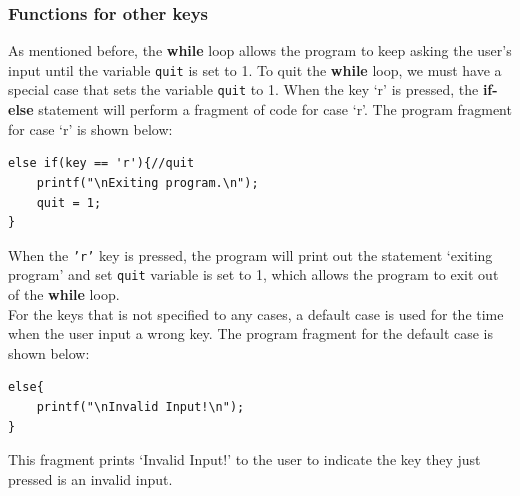 \documentclass[11pt]{article}
\begin{document}
\subsubsection*{Functions for other keys}
As mentioned before, the {\bf while} loop allows the program to keep asking the 
user's input until the variable {\tt quit} is set to 1. To quit the {\bf while} 
loop, we must have a special case that sets the variable {\tt quit} to 1. When 
the key `r' is pressed, the {\bf if-else} statement will perform a 
fragment of code for case `r'. The program fragment for case `r' is shown below:
\begin{lstlisting}
else if(key == 'r'){//quit
    printf("\nExiting program.\n");
    quit = 1;
}
\end{lstlisting}
When the {\tt 'r'} key is pressed, the program will print out the statement 
`exiting program' and set {\tt quit} variable is set to 1, which allows the 
program to exit out of the {\bf while} loop.\\

For the keys that is not specified to any cases, a default case is used for the 
time when the user input a wrong key. The program fragment for the default case 
is shown below:
\begin{lstlisting}
else{
    printf("\nInvalid Input!\n");
}
\end{lstlisting}
This fragment prints `Invalid Input!' to the user to indicate the key they just 
pressed is an invalid input.

\end{document}
